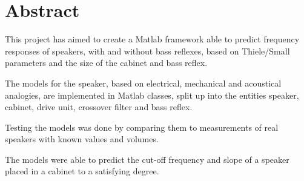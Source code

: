 
\chapter{Abstract}
\label{sec:Abstract}

This project has aimed to create a Matlab framework able to predict frequency responses of speakers, with and without bass reflexes, based on Thiele/Small parameters and the size of the cabinet and bass reflex.

The models for the speaker, based on electrical, mechanical and acoustical analogies, are implemented in Matlab classes, split up into the entities speaker, cabinet, drive unit, crossover filter and bass reflex.

Testing the models was done by comparing them to measurements of real speakers with known values and volumes.

The models were able to predict the cut-off frequency and slope of a speaker placed in a cabinet to a satisfying degree.